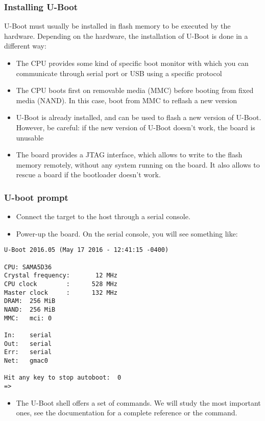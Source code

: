 \begin{frame}
  \frametitle{Installing U-Boot}
  U-Boot must usually be installed in flash memory to be
  executed by the hardware. Depending on the hardware, the
  installation of U-Boot is done in a different way:
  \begin{itemize}
  \item The CPU provides some kind of specific boot monitor with
    which you can communicate through serial port or USB using a
    specific protocol
  \item The CPU boots first on removable media (MMC) before booting
    from fixed media (NAND). In this case, boot from MMC to reflash
    a new version
  \item U-Boot is already installed, and can be used to flash a new
    version of U-Boot. However, be careful: if the new version of
    U-Boot doesn't work, the board is unusable
  \item The board provides a JTAG interface, which allows to write
    to the flash memory remotely, without any system running on the
    board. It also allows to rescue a board if the bootloader
    doesn't work.
  \end{itemize}
\end{frame}

\begin{frame}[fragile]
  \frametitle{U-boot prompt}
  \begin{itemize}
  \item Connect the target to the host through a serial console.
  \item Power-up the board. On the serial console, you will see
        something like:
  \end{itemize}
\tiny
\begin{verbatim}
U-Boot 2016.05 (May 17 2016 - 12:41:15 -0400)

CPU: SAMA5D36
Crystal frequency:       12 MHz
CPU clock        :      528 MHz
Master clock     :      132 MHz
DRAM:  256 MiB
NAND:  256 MiB
MMC:   mci: 0

In:    serial
Out:   serial
Err:   serial
Net:   gmac0

Hit any key to stop autoboot:  0
=>
\end{verbatim}
\normalsize
  \begin{itemize}
  \item The U-Boot shell offers a set of commands. We will study the
    most important ones, see the documentation for a complete
    reference or the  command.
  \end{itemize}
\end{frame}


